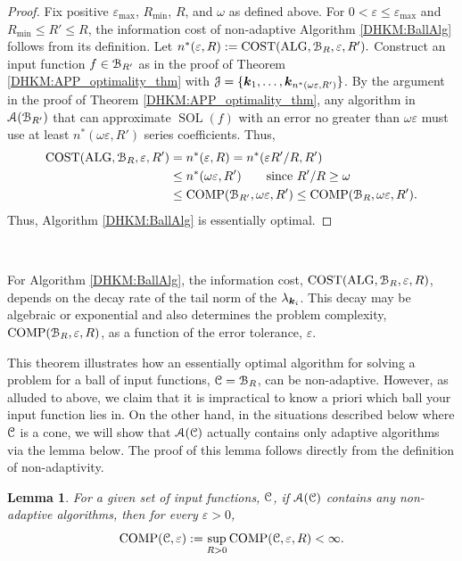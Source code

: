 \documentclass[USenglish]{article}
\theoremstyle{dgthm}
\theoremstyle{dgthm}
\newtheorem{lemma}[theorem]{Lemma}
\theoremstyle{dgthm}
\theoremstyle{dgthm}
\theoremstyle{dgdef}
\theoremstyle{definition}
\DeclareMathOperator{\DHKMSOL}{SOL}
\DeclareMathOperator{\DHKMALG}{ALG}
\DeclareMathOperator{\DHKMCOST}{COST}
\DeclareMathOperator{\DHKMCOMP}{COMP}
\begin{document}
\begin{proof}  Fix positive $\varepsilon_{\max}$, $R_{\min}$, $R$, and $\omega$ as defined above.  For $0 < \varepsilon \le \varepsilon_{\max}$ and $R_{\min} \le R' \le R$, the information cost of non-adaptive Algorithm  \ref{DHKM:BallAlg} follows from its definition.  Let 
$
n^*(\varepsilon,R) : = \DHKMCOST(\DHKMALG, \calB_R, \varepsilon,R').
$
Construct an input function $f \in {\mathcal{B}}_{R'}$ as in the proof of Theorem \ref{DHKM:APP_optimality_thm} with ${\mathcal{J}} = \{{\boldsymbol{k}}_1, \ldots, {\boldsymbol{k}}_{n^*(\omega \varepsilon,R')} \}$. By the argument in the proof of Theorem \ref{DHKM:APP_optimality_thm}, any algorithm in ${\mathcal{A}}({\mathcal{B}}_{R'})$ that can approximate $\DHKMSOL(f)$ with an error no greater than $\omega \varepsilon$ must use at least $n^*(\omega \varepsilon,R')$ series coefficients.  Thus, 
\begin{align*}
\DHKMCOST(\DHKMALG, \calB_R, \varepsilon,R') & =  n^*(\varepsilon,R) 
= n^*(\varepsilon R'/R,R') \\
& \le n^*(\omega \varepsilon, R') \qquad \text{since } R'/R \ge \omega
\\
& \le \DHKMCOMP(\calB_{R'},\omega \varepsilon, R') \le  \DHKMCOMP(\calB_{R},\omega \varepsilon, R').
\end{align*}
Thus, Algorithm \ref{DHKM:BallAlg} is essentially optimal.
\end{proof} \

For Algorithm \ref{DHKM:BallAlg}, the information cost, $\DHKMCOST(\DHKMALG,\calB_R,\varepsilon, R)$, depends on the decay rate of the tail norm of the $\lambda_{{\boldsymbol{k}}_i}$.  This decay may be algebraic or exponential and also determines the problem complexity, $\DHKMCOMP(\calB_R,\varepsilon, R)$, as a function of the error tolerance, $\varepsilon$.  


This theorem illustrates how an essentially optimal algorithm for solving a problem for a ball of input functions, ${\mathcal{C}} = {\mathcal{B}}_R$, can be non-adaptive.  However, as alluded to above, we claim that it is impractical to know a priori which ball your input function lies in.  On the other hand, in the situations described below where ${\mathcal{C}}$ is a cone, we will show that ${\mathcal{A}}({\mathcal{C}})$ actually contains only adaptive algorithms via the lemma below.  The proof of this lemma follows directly from the definition of non-adaptivity.

\begin{lemma} \label{DHKM:NoNonAdpatLem}
For a given set of input functions, ${\mathcal{C}}$, if  ${\mathcal{A}}({\mathcal{C}})$ contains any non-adaptive algorithms, then for every $\varepsilon > 0$,
\begin{equation*}
    \DHKMCOMP(\calC,\varepsilon) : = \sup_{R > 0} \DHKMCOMP(\calC,\varepsilon, R) < \infty.
\end{equation*}
\end{lemma}
\end{document}
